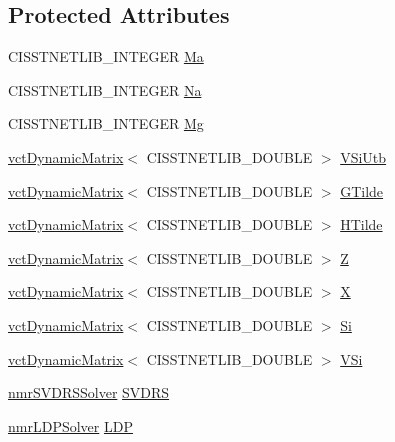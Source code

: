 \subsection*{Protected Attributes}
\begin{DoxyCompactItemize}
\item 
C\+I\+S\+S\+T\+N\+E\+T\+L\+I\+B\+\_\+\+I\+N\+T\+E\+G\+E\+R \hyperlink{classnmr_l_s_i_solver_a7c0ddb46f65e1e8504fba9b247c2b5c6}{Ma}
\item 
C\+I\+S\+S\+T\+N\+E\+T\+L\+I\+B\+\_\+\+I\+N\+T\+E\+G\+E\+R \hyperlink{classnmr_l_s_i_solver_aea6d39f413fd81118c7c6f9886263c2c}{Na}
\item 
C\+I\+S\+S\+T\+N\+E\+T\+L\+I\+B\+\_\+\+I\+N\+T\+E\+G\+E\+R \hyperlink{classnmr_l_s_i_solver_abd62da087c968c51eb33d185dab8e08f}{Mg}
\item 
\hyperlink{classvct_dynamic_matrix}{vct\+Dynamic\+Matrix}$<$ C\+I\+S\+S\+T\+N\+E\+T\+L\+I\+B\+\_\+\+D\+O\+U\+B\+L\+E $>$ \hyperlink{classnmr_l_s_i_solver_aacd1cede77ef83f0b256bdf0313c723a}{V\+Si\+Utb}
\item 
\hyperlink{classvct_dynamic_matrix}{vct\+Dynamic\+Matrix}$<$ C\+I\+S\+S\+T\+N\+E\+T\+L\+I\+B\+\_\+\+D\+O\+U\+B\+L\+E $>$ \hyperlink{classnmr_l_s_i_solver_a984e5149e5c8d0dcb08e06dab7839c27}{G\+Tilde}
\item 
\hyperlink{classvct_dynamic_matrix}{vct\+Dynamic\+Matrix}$<$ C\+I\+S\+S\+T\+N\+E\+T\+L\+I\+B\+\_\+\+D\+O\+U\+B\+L\+E $>$ \hyperlink{classnmr_l_s_i_solver_a0b156b28be901225f361dcc083070ee7}{H\+Tilde}
\item 
\hyperlink{classvct_dynamic_matrix}{vct\+Dynamic\+Matrix}$<$ C\+I\+S\+S\+T\+N\+E\+T\+L\+I\+B\+\_\+\+D\+O\+U\+B\+L\+E $>$ \hyperlink{classnmr_l_s_i_solver_a4d7c8e1a6139189dc37329bfd6743ae6}{Z}
\item 
\hyperlink{classvct_dynamic_matrix}{vct\+Dynamic\+Matrix}$<$ C\+I\+S\+S\+T\+N\+E\+T\+L\+I\+B\+\_\+\+D\+O\+U\+B\+L\+E $>$ \hyperlink{classnmr_l_s_i_solver_ac38debb9bd9fe2ab5de72a8c43195de5}{X}
\item 
\hyperlink{classvct_dynamic_matrix}{vct\+Dynamic\+Matrix}$<$ C\+I\+S\+S\+T\+N\+E\+T\+L\+I\+B\+\_\+\+D\+O\+U\+B\+L\+E $>$ \hyperlink{classnmr_l_s_i_solver_a9e3e65aec583b53f31d81317262aab44}{Si}
\item 
\hyperlink{classvct_dynamic_matrix}{vct\+Dynamic\+Matrix}$<$ C\+I\+S\+S\+T\+N\+E\+T\+L\+I\+B\+\_\+\+D\+O\+U\+B\+L\+E $>$ \hyperlink{classnmr_l_s_i_solver_aa7fbd3d91531ea1010e4abf548c02d44}{V\+Si}
\item 
\hyperlink{classnmr_s_v_d_r_s_solver}{nmr\+S\+V\+D\+R\+S\+Solver} \hyperlink{classnmr_l_s_i_solver_a7cf5b18af6140132bfdedf1ba53616d7}{S\+V\+D\+R\+S}
\item 
\hyperlink{classnmr_l_d_p_solver}{nmr\+L\+D\+P\+Solver} \hyperlink{classnmr_l_s_i_solver_afe8fa5a7652c9abcb817eaa9c28d0f6a}{L\+D\+P}
\end{DoxyCompactItemize}


